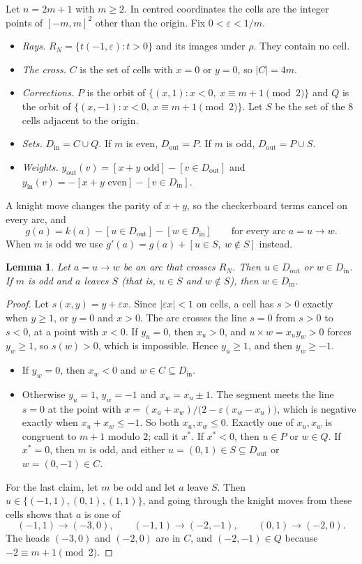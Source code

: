\documentclass[11pt]{amsart}
\newtheorem{lemma}[theorem]{Lemma}
\theoremstyle{remark}
\newcommand{\Dout}{D_{\mathrm{out}}}
\newcommand{\Din}{D_{\mathrm{in}}}
\newcommand{\yout}{y_{\mathrm{out}}}
\newcommand{\yin}{y_{\mathrm{in}}}
\begin{document}
Let $n=2m+1$ with $m\ge2$. In centred coordinates the cells are the integer points of $[-m,m]^2$ other than the
origin. Fix $0<\varepsilon<1/m$.
\begin{itemize}
\item \emph{Rays.} $R_N=\{t(-1,\varepsilon):t>0\}$ and its images under $\rho$. They contain no cell.
\item \emph{The cross.} $C$ is the set of cells with $x=0$ or $y=0$, so $|C|=4m$.
\item \emph{Corrections.} $P$ is the orbit of $\{(x,1): x<0,\ x\equiv m+1 \pmod 2\}$ and $Q$ is the orbit of
$\{(x,-1): x<0,\ x\equiv m+1\pmod 2\}$. Let $S$ be the set of the $8$ cells adjacent to the origin.
\item \emph{Sets.} $\Din=C\cup Q$. If $m$ is even, $\Dout=P$. If $m$ is odd, $\Dout=P\cup S$.
\item \emph{Weights.} $\yout(v)=[x+y\text{ odd}]-[v\in\Dout]$ and $\yin(v)=-[x+y\text{ even}]-[v\in\Din]$.
\end{itemize}
A knight move changes the parity of $x+y$, so the checkerboard terms cancel on every arc, and
\[ g(a)=k(a)-[u\in\Dout]-[w\in\Din]\qquad\text{for every arc }a=u\to w. \]
When $m$ is odd we use $g'(a)=g(a)+[u\in S,\ w\notin S]$ instead.

\begin{lemma}\label{lem:north}
Let $a=u\to w$ be an arc that crosses $R_N$. Then $u\in\Dout$ or $w\in\Din$. If $m$ is odd and $a$ leaves $S$
(that is, $u\in S$ and $w\notin S$), then $w\in\Din$.
\end{lemma}
\begin{proof}
Let $s(x,y)=y+\varepsilon x$. Since $|\varepsilon x|<1$ on cells, a cell has $s>0$ exactly when $y\ge1$, or $y=0$ and
$x>0$. The arc crosses the line $s=0$ from $s>0$ to $s<0$, at a point with $x<0$. If $y_u=0$, then $x_u>0$, and
$u\times w=x_uy_w>0$ forces $y_w\ge1$, so $s(w)>0$, which is impossible. Hence $y_u\ge1$, and then $y_w\ge -1$.
\begin{itemize}
\item If $y_w=0$, then $x_w<0$ and $w\in C\subseteq\Din$.
\item Otherwise $y_u=1$, $y_w=-1$ and $x_w=x_u\pm1$. The segment meets the line $s=0$ at the point with
$x=(x_u+x_w)/\bigl(2-\varepsilon(x_w-x_u)\bigr)$, which is negative exactly when $x_u+x_w\le-1$. So both
$x_u,x_w\le0$. Exactly one of $x_u,x_w$ is congruent to $m+1$ modulo $2$; call it $x^*$.
If $x^*<0$, then $u\in P$ or $w\in Q$. If $x^*=0$, then $m$ is odd, and either $u=(0,1)\in S\subseteq\Dout$ or
$w=(0,-1)\in C$.
\end{itemize}
For the last claim, let $m$ be odd and let $a$ leave $S$. Then $u\in\{(-1,1),(0,1),(1,1)\}$, and going through the
knight moves from these cells shows that $a$ is one of
\[ (-1,1)\to(-3,0),\qquad (-1,1)\to(-2,-1),\qquad (0,1)\to(-2,0). \]
The heads $(-3,0)$ and $(-2,0)$ are in $C$, and $(-2,-1)\in Q$ because $-2\equiv m+1\pmod 2$.
\end{proof}
\end{document}
